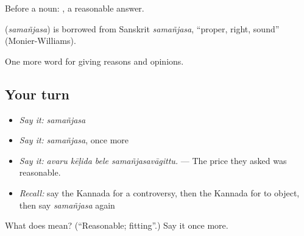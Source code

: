 Before a noun:  , a reasonable answer.

\begin{cousinweb}
\textbf{} (\emph{samañjasa}) is borrowed from Sanskrit \emph{samañjasa}, \textquotedblleft{}proper, right, sound\textquotedblright{} (Monier-Williams).
\end{cousinweb}

\begin{grammarlens}[title={What you've built}]
One more word for giving reasons and opinions.
\end{grammarlens}

\subsection*{Your turn}
\begin{itemize}
\raggedright
  \item \emph{Say it:} \emph{samañjasa}
  \item \emph{Say it:} \emph{samañjasa}, once more
  \item \emph{Say it:} \emph{avaru kēḷida bele samañjasavāgittu.} — The price they asked was reasonable.
  \item \emph{Recall:} say the Kannada for a controversy, then the Kannada for to object, then say \emph{samañjasa} again
\end{itemize}

\begin{tcolorbox}[breakable,colback=teal!4,colframe=teal!35!black,title={Before you move on}]
What does  mean? (\textquotedblleft{}Reasonable; fitting\textquotedblright{}.) Say it once more.
\end{tcolorbox}
